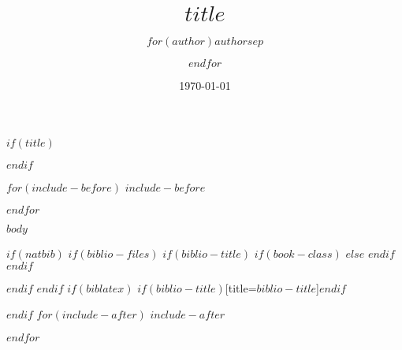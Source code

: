 \documentclass[10pt,a4j]{jarticle}
\title{$title$}
\author{$for(author)$$author$$sep$ \and $endfor$}
\date{\today}
\makeatletter
\renewcommand{\maketitle}{
\begin{center}
  {\LARGE\textbf \@title{}}
\end{center}
}
\makeatother
\begin{document}
$if(title)$
\maketitle
\thispagestyle{empty}
$endif$

$for(include-before)$
$include-before$

$endfor$

$body$

$if(natbib)$
$if(biblio-files)$
$if(biblio-title)$
$if(book-class)$
\renewcommand\bibname{$biblio-title$}
$else$
\renewcommand\refname{$biblio-title$}
$endif$
$endif$


$endif$
$endif$
$if(biblatex)$
\printbibliography$if(biblio-title)$[title=$biblio-title$]$endif$

$endif$
$for(include-after)$
$include-after$

$endfor$
\end{document}
